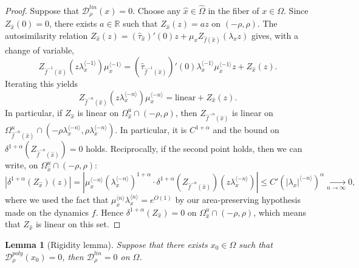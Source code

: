 \documentclass[a4paper]{article}
\newtheorem{lemma}[theorem]{Lemma}
\theoremstyle{definition}
\begin{document}
\begin{proof}
Suppose that $\mathcal{D}_\rho^{lin}(x)=0$. Choose any $\widehat{x} \in \widehat{\Omega}$ in the fiber of $x \in \Omega$. Since $Z_{\widehat{x}}(0)=0$, there exists $a \in \mathbb{R}$ such that $Z_{\widehat{x}}(z) = az$ on $(-\rho,\rho)$. The autosimilarity relation $Z_{\widehat{x}}(z) = (\widehat{\tau}_{\widehat{x}})'(0)z + \mu_x Z_{\widehat{f}({\widehat{x}})}(\lambda_x z)$ gives, with a change of variable,
$$ Z_{\widehat{f}^{-1}({\widehat{x}})}(z \lambda_x^{\langle -1 \rangle}) \mu_x^{\langle -1 \rangle} = (\widehat{\tau}_{\widehat{f}^{-1}({\widehat{x}})})'(0) \lambda_x^{\langle -1 \rangle} \mu_x^{\langle -1 \rangle} z + Z_{{\widehat{x}}}(z) .$$
Iterating this yields $$ Z_{\widehat{f}^{-n}({\widehat{x}})}(z \lambda_x^{\langle -n \rangle}) \mu_x^{\langle -n \rangle} = \text{linear} +  Z_{\widehat{x}}(z) .$$
In particular, if $Z_{\widehat{x}}$ is linear on $\Omega_{\widehat{x}}^u \cap (-\rho,\rho)$, then $Z_{\widehat{f}^{-n}({\widehat{x}})}$ is linear on $\Omega_{\widehat{f}^{-n}({\widehat{x}})}^u \cap (-\rho \lambda_x^{\langle -n \rangle } , \rho \lambda_x^{\langle -n \rangle}) $. In particular, it is $C^{1+\alpha}$ and the bound on $\delta^{1+\alpha}(Z_{\widehat{f}^{-n}({\widehat{x}})}) = 0$ holds. Reciprocally, if the second point holds, then we can write, on $\Omega_{\widehat{x}}^u \cap (-\rho,\rho)$:
$$ |\delta^{1+\alpha}(Z_{\widehat{x}})(z)| = |\mu_x^{ \langle - n \rangle} (\lambda_x^{ \langle -n \rangle })^{1+\alpha} \cdot \delta^{1+\alpha}(Z_{\widehat{f}^{-n}({\widehat{x}})})(z \lambda_x^{\langle -n \rangle})| \leq C' (|\lambda_x|^{\langle -n \rangle})^{\alpha} \underset{n \rightarrow \infty}{\longrightarrow} 0,  $$
where we used the fact that $\mu_x^{\langle n \rangle} \lambda_x^{\langle n \rangle} = e^{O(1)}$ by our area-preserving hypothesis made on the dynamics $f$. Hence $\delta^{1+\alpha}(Z_{\widehat{x}})=0$ on $\Omega_{\widehat{x}}^u \cap (-\rho,\rho)$, which means that $Z_{\widehat{x}}$ is linear on this set.
\end{proof}

\begin{lemma}[Rigidity lemma]
Suppose that there exists $x_0 \in \Omega$ such that $\mathcal{D}_\rho^{poly}(x_0) = 0$, then $\mathcal{D}_\rho^{lin} = 0$ on $\Omega$.
\end{lemma}
\end{document}
